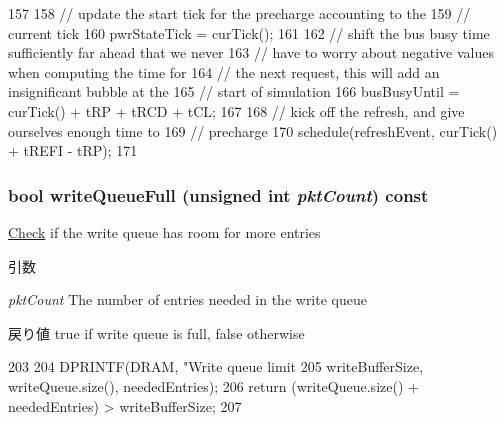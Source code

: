 \begin{DoxyCode}
157 {
158     // update the start tick for the precharge accounting to the
159     // current tick
160     pwrStateTick = curTick();
161 
162     // shift the bus busy time sufficiently far ahead that we never
163     // have to worry about negative values when computing the time for
164     // the next request, this will add an insignificant bubble at the
165     // start of simulation
166     busBusyUntil = curTick() + tRP + tRCD + tCL;
167 
168     // kick off the refresh, and give ourselves enough time to
169     // precharge
170     schedule(refreshEvent, curTick() + tREFI - tRP);
171 }
\end{DoxyCode}
\hypertarget{classDRAMCtrl_a34f56ea41ba7accf7b75a46aa79b560c}{
\subsubsection[{writeQueueFull}]{\setlength{\rightskip}{0pt plus 5cm}bool writeQueueFull (unsigned int {\em pktCount}) const}}
\label{classDRAMCtrl_a34f56ea41ba7accf7b75a46aa79b560c}
\hyperlink{classCheck}{Check} if the write queue has room for more entries


\begin{DoxyParams}{引数}
\item[{\em pktCount}]The number of entries needed in the write queue \end{DoxyParams}
\begin{DoxyReturn}{戻り値}
true if write queue is full, false otherwise 
\end{DoxyReturn}



\begin{DoxyCode}
203 {
204     DPRINTF(DRAM, "Write queue limit %
205             writeBufferSize, writeQueue.size(), neededEntries);
206     return (writeQueue.size() + neededEntries) > writeBufferSize;
207 }
\end{DoxyCode}


